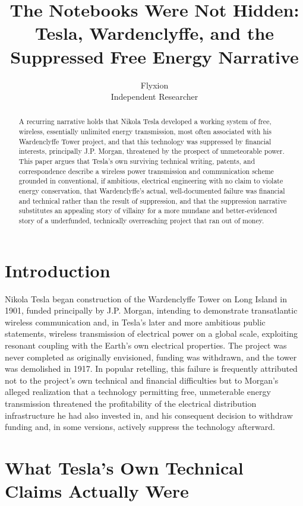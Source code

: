 \documentclass[11pt]{article}
\title{The Notebooks Were Not Hidden: Tesla, Wardenclyffe, and the Suppressed Free Energy Narrative}
\author{Flyxion \\ \small Independent Researcher}
\date{}
\begin{document}
\maketitle

\begin{abstract}
A recurring narrative holds that Nikola Tesla developed a working system of free, wireless, essentially unlimited energy transmission, most often associated with his Wardenclyffe Tower project, and that this technology was suppressed by financial interests, principally J.P. Morgan, threatened by the prospect of unmeteorable power. This paper argues that Tesla's own surviving technical writing, patents, and correspondence describe a wireless power transmission and communication scheme grounded in conventional, if ambitious, electrical engineering with no claim to violate energy conservation, that Wardenclyffe's actual, well-documented failure was financial and technical rather than the result of suppression, and that the suppression narrative substitutes an appealing story of villainy for a more mundane and better-evidenced story of a underfunded, technically overreaching project that ran out of money.
\end{abstract}

\section{Introduction}

Nikola Tesla began construction of the Wardenclyffe Tower on Long Island in 1901, funded principally by J.P. Morgan, intending to demonstrate transatlantic wireless communication and, in Tesla's later and more ambitious public statements, wireless transmission of electrical power on a global scale, exploiting resonant coupling with the Earth's own electrical properties. The project was never completed as originally envisioned, funding was withdrawn, and the tower was demolished in 1917. In popular retelling, this failure is frequently attributed not to the project's own technical and financial difficulties but to Morgan's alleged realization that a technology permitting free, unmeterable energy transmission threatened the profitability of the electrical distribution infrastructure he had also invested in, and his consequent decision to withdraw funding and, in some versions, actively suppress the technology afterward.

\section{What Tesla's Own Technical Claims Actually Were}
\end{document}
